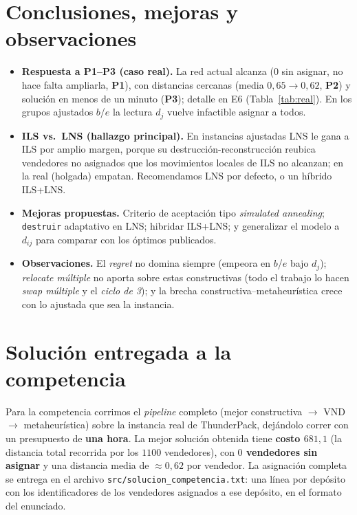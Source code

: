\documentclass[11pt,a4paper]{article}
\newcommand{\code}[1]{\texttt{#1}}
\begin{document}
\section{Conclusiones, mejoras y observaciones}\label{sec:concl}
\begin{itemize}
  \item \textbf{Respuesta a P1--P3 (caso real).} La red actual alcanza (0 sin asignar, no hace
        falta ampliarla, \textbf{P1}), con distancias cercanas (media $0{,}65\to0{,}62$,
        \textbf{P2}) y solución en menos de un minuto (\textbf{P3}); detalle en E6
        (Tabla~\ref{tab:real}). En los grupos ajustados $b$/$e$ la lectura $d_j$ vuelve
        infactible asignar a todos.
  \item \textbf{ILS vs.\ LNS (hallazgo principal).} En instancias ajustadas LNS le gana a ILS
        por amplio margen, porque su destrucción-reconstrucción reubica vendedores no asignados
        que los movimientos locales de ILS no alcanzan; en la real (holgada) empatan.
        Recomendamos LNS por defecto, o un híbrido ILS+LNS.
  \item \textbf{Mejoras propuestas.} Criterio de aceptación tipo \emph{simulated annealing};
        \code{destruir} adaptativo en LNS; hibridar ILS+LNS; y generalizar el modelo a $d_{ij}$
        para comparar con los óptimos publicados.
  \item \textbf{Observaciones.} El \emph{regret} no domina siempre (empeora en $b$/$e$ bajo
        $d_j$); \emph{relocate múltiple} no aporta sobre estas constructivas (todo el trabajo lo
        hacen \emph{swap múltiple} y el \emph{ciclo de 3}); y la brecha
        constructiva--metaheurística crece con
        lo ajustada que sea la instancia.
\end{itemize}

\section{Solución entregada a la competencia}
Para la competencia corrimos el \emph{pipeline} completo (mejor constructiva $\to$ VND $\to$
metaheurística) sobre la instancia real de ThunderPack, dejándolo correr con un presupuesto de
\textbf{una hora}. La mejor solución obtenida tiene \textbf{costo $681{,}1$} (la distancia total
recorrida por los $1100$ vendedores), con \textbf{$0$ vendedores sin asignar} y una distancia
media de $\approx\!0{,}62$ por vendedor. La asignación completa se entrega en el archivo
\code{src/solucion\_competencia.txt}: una línea por depósito con los identificadores de los
vendedores asignados a ese depósito, en el formato del enunciado.
\end{document}
